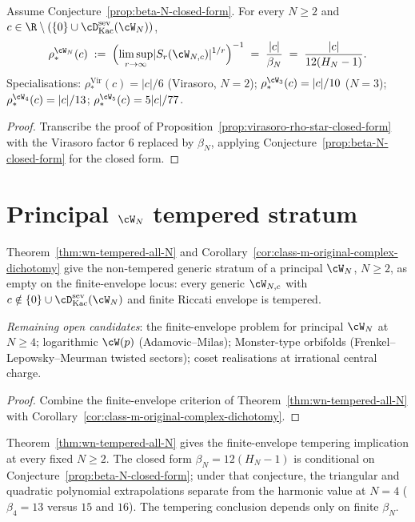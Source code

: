 \begin{proposition}
\label{prop:rho-star-WN-closed-form}
\ClaimStatusConditional
Assume Conjecture~\ref{prop:beta-N-closed-form}. For every $N \ge 2$
and $c \in \R \setminus (\{0\} \cup
\cD^{\mathrm{sev}}_{\mathrm{Kac}}(\cW_N))$,
\[
 \rho_*^{\cW_N}(c)
 \;:=\;
 \Bigl( \limsup_{r \to \infty} \lvert S_r(\cW_{N,c}) \rvert^{1/r}
 \Bigr)^{-1}
 \;=\;
 \frac{\lvert c \rvert}{\beta_N}
 \;=\;
 \frac{\lvert c\rvert}{12(H_N - 1)}.
\]
Specialisations: $\rho_*^{\mathrm{Vir}}(c) = |c|/6$ (Virasoro,
$N=2$); $\rho_*^{\cW_3}(c) = |c|/10$ ($N=3$);
$\rho_*^{\cW_4}(c)=|c|/13$; $\rho_*^{\cW_5}(c)=5|c|/77$.
\end{proposition}

\begin{proof}
Transcribe the proof of
Proposition~\ref{prop:virasoro-rho-star-closed-form} with the
Virasoro factor $6$ replaced by $\beta_N$, applying
Conjecture~\ref{prop:beta-N-closed-form} for the closed form.
\end{proof}

\section{Principal $\cW_N$ tempered stratum}
\label{sec:wn-dichotomy-healed}

\begin{corollary}
\label{cor:wn-original-complex-dichotomy-healed}
\ClaimStatusConditional
Theorem~\ref{thm:wn-tempered-all-N} and
Corollary~\ref{cor:class-m-original-complex-dichotomy} give the
non-tempered generic stratum of a principal $\cW_N$, $N \ge 2$, as
empty on the finite-envelope locus: every generic $\cW_{N,c}$ with
$c \notin \{0\} \cup \cD^{\mathrm{sev}}_{\mathrm{Kac}}(\cW_N)$ and
finite Riccati envelope is tempered.

\emph{Remaining open candidates}: the finite-envelope problem for
principal $\cW_N$ at $N\ge4$; logarithmic $\cW(p)$ (Adamovic--Milas);
Monster-type orbifolds (Frenkel--Lepowsky--Meurman twisted sectors);
coset realisations at irrational central charge.
\end{corollary}

\begin{proof}
Combine the finite-envelope criterion of
Theorem~\ref{thm:wn-tempered-all-N} with
Corollary~\ref{cor:class-m-original-complex-dichotomy}.
\end{proof}

\begin{remark}
\label{rem:wn-harmonic-beta-law}
Theorem~\ref{thm:wn-tempered-all-N} gives the finite-envelope
tempering implication at every fixed $N \ge 2$. The closed form
$\beta_N = 12(H_N - 1)$ is conditional on
Conjecture~\ref{prop:beta-N-closed-form}; under that conjecture, the
triangular and quadratic polynomial extrapolations separate from the
harmonic value at $N = 4$ ($\beta_4=13$ versus $15$ and $16$). The
tempering conclusion depends only on finite $\beta_N$.
\end{remark}

